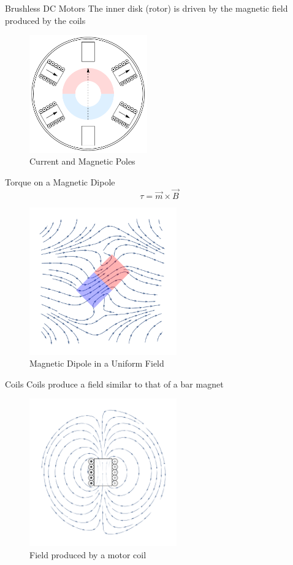 \documentclass{beamer}
\begin{document}
    \begin{frame}{Brushless DC Motors}
        The inner disk (rotor) is driven by the magnetic field produced by the coils
        \begin{figure}
            \center
            \includegraphics[width=2in]{motor_arrows.pdf}
            \caption*{Current and Magnetic Poles}
        \end{figure}
    \end{frame}

    \begin{frame}{Torque on a Magnetic Dipole}
        \[\tau = \vec{m} \times \vec{B}\]
        \begin{figure}
            \center
            \includegraphics[width=2.5in]{Momento_torcente_magnetico.pdf}
            \caption*{Magnetic Dipole in a Uniform Field}
        \end{figure}
    \end{frame}

    \begin{frame}{Coils}
        Coils produce a field similar to that of a bar magnet
        \begin{figure}
            \center
            \includegraphics[width=2.5in]{coil.pdf}
            \caption*{Field produced by a motor coil}
        \end{figure}
    \end{frame}
\end{document}
